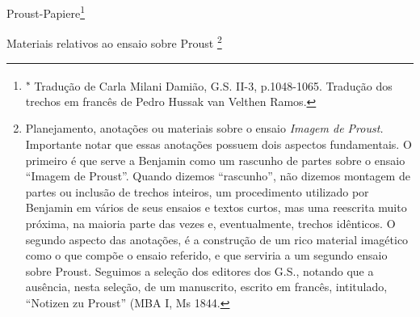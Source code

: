 Proust-Papiere\footnote{\textsuperscript{∗} Tradução de Carla Milani
  Damião, G.S. II-3, p.1048-1065. Tradução dos trechos em francês de
  Pedro Hussak van Velthen Ramos.}

Materiais relativos ao ensaio sobre Proust \footnote{Planejamento,
  anotações ou materiais sobre o ensaio \emph{Imagem de Proust.}
  Importante notar que essas anotações possuem dois aspectos
  fundamentais. O primeiro é que serve a Benjamin como um rascunho de
  partes sobre o ensaio ``Imagem de Proust''. Quando dizemos
  ``rascunho'', não dizemos montagem de partes ou inclusão de trechos
  inteiros, um procedimento utilizado por Benjamin em vários de seus
  ensaios e textos curtos, mas uma reescrita muito próxima, na maioria
  parte das vezes e, eventualmente, trechos idênticos. O segundo aspecto
  das anotações, é a construção de um rico material imagético como o que
  compõe o ensaio referido, e que serviria a um segundo ensaio sobre
  Proust. Seguimos a seleção dos editores dos G.S., notando que a
  ausência, nesta seleção, de um manuscrito, escrito em francês,
  intitulado, ``Notizen zu Proust'' (MBA I, Ms 1844.}

